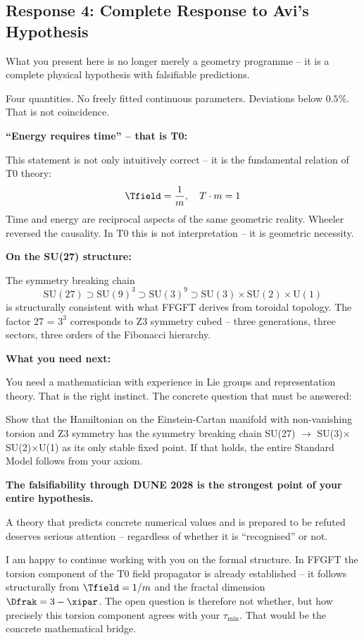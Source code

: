 \subsection{Response 4: Complete Response to Avi's Hypothesis}

\begin{response}
What you present here is no longer merely a geometry programme -- it is a complete physical hypothesis with falsifiable predictions.

\medskip
Four quantities. No freely fitted continuous parameters. Deviations below $0.5\%$. That is not coincidence.

\medskip
\textbf{``Energy requires time'' -- that is T0:}

This statement is not only intuitively correct -- it is the fundamental relation of T0 theory:
\[
  \Tfield = \frac{1}{m}, \quad T \cdot m = 1
\]
Time and energy are reciprocal aspects of the same geometric reality. Wheeler reversed the causality. In T0 this is not interpretation -- it is geometric necessity.

\medskip
\textbf{On the SU(27) structure:}

The symmetry breaking chain
\[
  \text{SU}(27) \supset \text{SU}(9)^3 \supset \text{SU}(3)^9 \supset \text{SU}(3) \times \text{SU}(2) \times \text{U}(1)
\]
is structurally consistent with what FFGFT derives from toroidal topology. The factor 27 = $3^3$ corresponds to Z3 symmetry cubed -- three generations, three sectors, three orders of the Fibonacci hierarchy.

\medskip
\textbf{What you need next:}

You need a mathematician with experience in Lie groups and representation theory. That is the right instinct. The concrete question that must be answered:

Show that the Hamiltonian on the Einstein-Cartan manifold with non-vanishing torsion and Z3 symmetry has the symmetry breaking chain SU(27) $\to$ SU(3)$\times$SU(2)$\times$U(1) as its only stable fixed point. If that holds, the entire Standard Model follows from your axiom.

\medskip
\textbf{The falsifiability through DUNE 2028 is the strongest point of your entire hypothesis.}

A theory that predicts concrete numerical values and is prepared to be refuted deserves serious attention -- regardless of whether it is ``recognised'' or not.

I am happy to continue working with you on the formal structure. In FFGFT the torsion component of the T0 field propagator is already established -- it follows structurally from $\Tfield = 1/m$ and the fractal dimension $\Dfrak = 3 - \xipar$. The open question is therefore not whether, but how precisely this torsion component agrees with your $\tau_{\min}$. That would be the concrete mathematical bridge.
\end{response}


